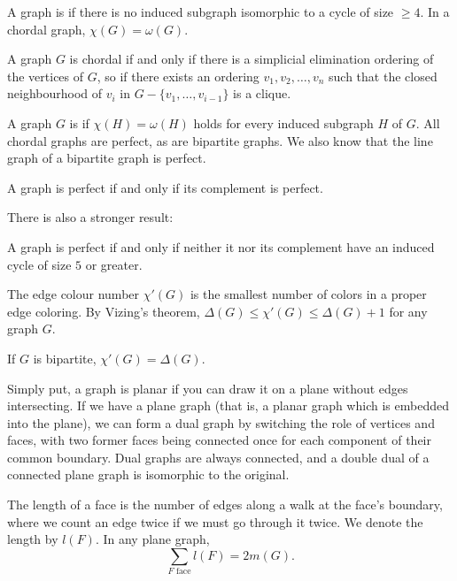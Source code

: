 A graph is  if there is no induced subgraph isomorphic to a cycle
of size $\ge 4$.
In a chordal graph, $\chi(G) = \omega(G)$.

\begin{theorem}
  A graph $G$ is chordal if and only if there is a simplicial elimination
  ordering of the vertices of $G$, so if there exists an ordering $v_1, v_2,
  \ldots, v_n$ such that the closed neighbourhood of $v_i$ in $G - \{v_1,
  \ldots, v_{i-1}\}$ is a clique.
\end{theorem}

A graph $G$ is  if $\chi(H) = \omega(H)$ holds for every induced
subgraph $H$ of $G$.
All chordal graphs are perfect, as are bipartite graphs.
We also know that the line graph of a bipartite graph is perfect.

\begin{theorem}
  A graph is perfect if and only if its complement is perfect.
\end{theorem}

There is also a stronger result:

\begin{theorem}
  A graph is perfect if and only if neither it nor its complement have an
  induced cycle of size $5$ or greater.
\end{theorem}


The edge colour number $\chi'(G)$ is the smallest number of colors in a proper
edge coloring.
By Vizing's theorem, $\Delta(G) \le \chi'(G) \le \Delta(G) + 1$ for any graph
$G$.

\begin{proposition}
  If $G$ is bipartite, $\chi'(G) = \Delta(G)$.
\end{proposition}


Simply put, a graph is planar if you can draw it on a plane without edges
intersecting.
If we have a plane graph (that is, a planar graph which is embedded into the
plane), we can form a dual graph by switching the role of vertices and faces,
with two former faces being connected once for each component of their common
boundary.
Dual graphs are always connected, and a double dual of a connected plane graph
is isomorphic to the original.

The length of a face is the number of edges along a walk at the face's boundary,
where we count an edge twice if we must go through it twice.
We denote the length by $l(F)$.
In any plane graph,
\[
  \sum_{\text{$F$ face}} l(F) = 2 m(G).
\]

